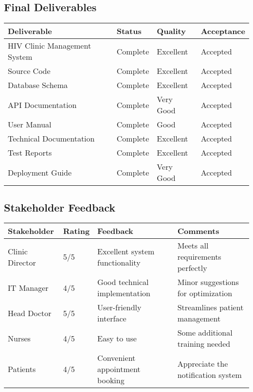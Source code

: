 \documentclass[12pt,a4paper]{article}
\begin{document}
\subsection{Final Deliverables}
\begin{longtable}{|p{5cm}|p{3cm}|p{3cm}|p{3cm}|}
\hline
\rowcolor{lightgray}
\textbf{Deliverable} & \textbf{Status} & \textbf{Quality} & \textbf{Acceptance} \\
\hline
HIV Clinic Management System & \cellcolor{completedgreen}Complete & Excellent & Accepted \\
\hline
Source Code & \cellcolor{completedgreen}Complete & Excellent & Accepted \\
\hline
Database Schema & \cellcolor{completedgreen}Complete & Excellent & Accepted \\
\hline
API Documentation & \cellcolor{completedgreen}Complete & Very Good & Accepted \\
\hline
User Manual & \cellcolor{completedgreen}Complete & Good & Accepted \\
\hline
Technical Documentation & \cellcolor{completedgreen}Complete & Excellent & Accepted \\
\hline
Test Reports & \cellcolor{completedgreen}Complete & Excellent & Accepted \\
\hline
Deployment Guide & \cellcolor{completedgreen}Complete & Very Good & Accepted \\
\hline
\end{longtable}

\subsection{Stakeholder Feedback}
\begin{longtable}{|p{3cm}|p{2cm}|p{4cm}|p{5cm}|}
\hline
\rowcolor{lightgray}
\textbf{Stakeholder} & \textbf{Rating} & \textbf{Feedback} & \textbf{Comments} \\
\hline
Clinic Director & 5/5 & Excellent system functionality & Meets all requirements perfectly \\
\hline
IT Manager & 4/5 & Good technical implementation & Minor suggestions for optimization \\
\hline
Head Doctor & 5/5 & User-friendly interface & Streamlines patient management \\
\hline
Nurses & 4/5 & Easy to use & Some additional training needed \\
\hline
Patients & 4/5 & Convenient appointment booking & Appreciate the notification system \\
\hline
\end{longtable}
\end{document}
